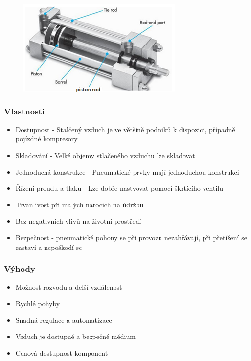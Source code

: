 \begin{figure}[h]
    \begin{center}
        \includegraphics[scale = 1]{img/Picture10.png}
    \end{center}
\end{figure}

\subsubsection*{Vlastnosti}
\begin{itemize}
    \item Dostupnost - Stalčený vzduch je ve většině podniků k dispozici, případně pojízdné kompresory
    \item Skladování - Velké objemy stlačeného vzduchu lze skladovat
    \item Jednoduchá konstrukce - Pneumatické prvky mají jednoduchou konstrukci
    \item Řízení proudu a tlaku - Lze dobře nastvovat pomocí škrtícího ventilu
    \item Trvanlivost při malých nárocích na údržbu
    \item Bez negativních vlivů na životní prostředí
    \item Bezpečnost - pneumatické pohony se při provozu nezahřávají, při přetížení se zastaví a nepoškodí se
\end{itemize}

\subsubsection*{Výhody}
\begin{itemize}
    \item Možnost rozvodu a delší vzdálenost
    \item Rychlé pohyby
    \item Snadná regulace a automatizace
    \item Vzduch je dostupné a bezpečné médium
    \item Cenová dostupnost komponent
\end{itemize}

